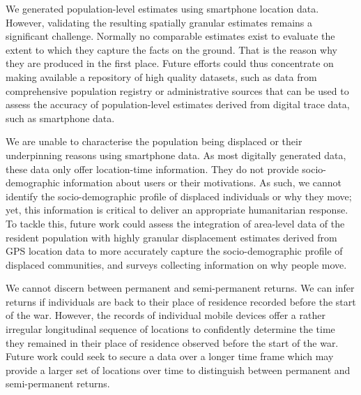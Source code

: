 \documentclass[
  sn-nature,
  11pt,
]{sn-jnl}
\begin{document}
We generated population-level estimates using smartphone location data.
However, validating the resulting spatially granular estimates remains a
significant challenge. Normally no comparable estimates exist to
evaluate the extent to which they capture the facts on the ground. That
is the reason why they are produced in the first place. Future efforts
could thus concentrate on making available a repository of high quality
datasets, such as data from comprehensive population registry or
administrative sources that can be used to assess the accuracy of
population-level estimates derived from digital trace data, such as
smartphone data.

We are unable to characterise the population being displaced or their
underpinning reasons using smartphone data. As most digitally generated
data, these data only offer location-time information. They do not
provide socio-demographic information about users or their motivations.
As such, we cannot identify the socio-demographic profile of displaced
individuals or why they move; yet, this information is critical to
deliver an appropriate humanitarian response. To tackle this, future
work could assess the integration of area-level data of the resident
population with highly granular displacement estimates derived from GPS
location data to more accurately capture the socio-demographic profile
of displaced communities, and surveys collecting information on why
people move.

We cannot discern between permanent and semi-permanent returns. We can
infer returns if individuals are back to their place of residence
recorded before the start of the war. However, the records of individual
mobile devices offer a rather irregular longitudinal sequence of
locations to confidently determine the time they remained in their place
of residence observed before the start of the war. Future work could
seek to secure a data over a longer time frame which may provide a
larger set of locations over time to distinguish between permanent and
semi-permanent returns.
\end{document}
